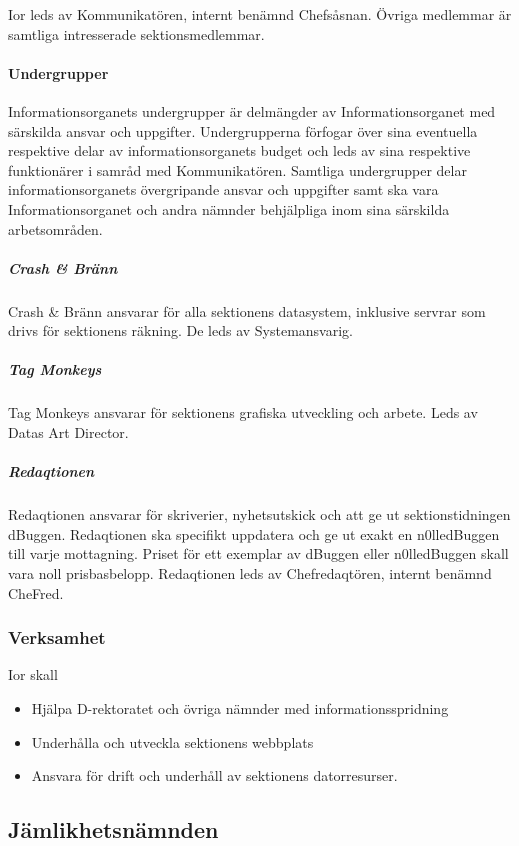 \documentclass{dgovdoc}
\begin{document}
Ior leds av Kommunikatören, internt benämnd Chefsåsnan. Övriga medlemmar
är samtliga intresserade sektionsmedlemmar.

\paragraph{Undergrupper}

Informationsorganets undergrupper är delmängder av Informationsorganet
med särskilda ansvar och uppgifter. Undergrupperna förfogar
över sina eventuella respektive delar av informationsorganets budget
och leds av sina respektive funktionärer i samråd med Kommunikatören.
Samtliga undergrupper delar informationsorganets
övergripande ansvar och uppgifter samt ska vara Informationsorganet
och andra nämnder behjälpliga inom sina särskilda arbetsområden.

\subparagraph{Crash \& Bränn}

Crash \& Bränn ansvarar för alla sektionens datasystem, inklusive servrar som drivs för sektionens räkning. De leds av Systemansvarig.

\subparagraph{Tag Monkeys}

Tag Monkeys ansvarar för sektionens grafiska utveckling och
arbete. Leds av Datas Art Director.

\subparagraph{Redaqtionen}

Redaqtionen ansvarar för skriverier, nyhetsutskick och att ge
ut sektionstidningen dBuggen. Redaqtionen ska specifikt uppdatera
och ge ut exakt en n0lledBuggen till varje mottagning.
Priset för ett exemplar av dBuggen eller n0lledBuggen skall
vara noll prisbasbelopp. Redaqtionen leds av Chefredaqtören,
internt benämnd CheFred.

\subsubsection{Verksamhet}

Ior skall

\begin{itemize}
  \item Hjälpa D-rektoratet och övriga nämnder med informationsspridning
  \item Underhålla och utveckla sektionens webbplats
  \item Ansvara för drift och underhåll av sektionens datorresurser.
\end{itemize}

\subsection{Jämlikhetsnämnden}
\end{document}
